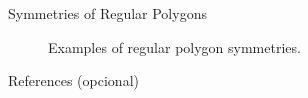 \documentclass[final]{beamer}
\newlength{\sepwidth}
\newlength{\colwidth}
\newcommand{\separatorcolumn}{\begin{column}{\sepwidth}\end{column}}
\begin{document}
\begin{frame}[t]
\begin{columns}[t]
\begin{column}{\colwidth}
\begin{alertblock}{Symmetries of Regular Polygons}
\begin{figure}[H]
   \caption*{Examples of regular polygon \alert{symmetries}.}
  \end{figure}
 \end{alertblock}

  \begin{block}{References (opcional)}

    \nocite{*}
    \footnotesize{}

  \end{block}

\end{column}
\separatorcolumn


\end{columns}
\end{frame}
\end{document}
